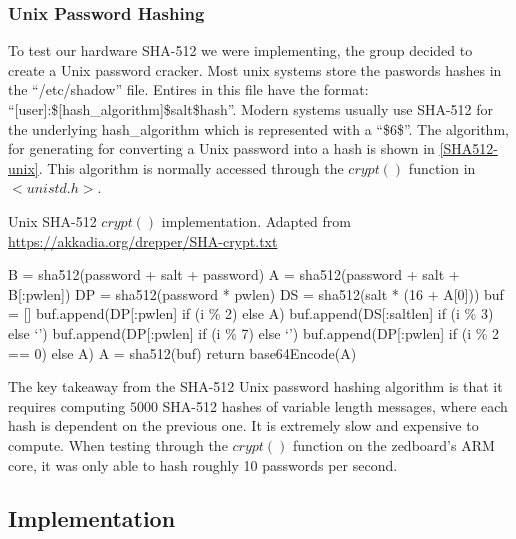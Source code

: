 \subsubsection{Unix Password Hashing}
To test our hardware SHA-512 we were implementing, the group decided to create a
Unix password cracker. Most unix systems store the paswords hashes in the
``/etc/shadow'' file. Entires in this file have the format: ``[user]:\$[hash\_algorithm]\$salt\$hash''.
Modern systems usually use SHA-512 for the underlying hash\_algorithm which is represented
with a ``\$6\$''. The algorithm, for generating for converting a Unix password
into a hash is shown in \ref{SHA512-unix}. This algorithm is normally
accessed through the $crypt()$ function in $<unistd.h>$.

\begin{algorithm}[!htb]
  \label{SHA512-unix}
  \caption{Unix SHA-512 $crypt()$ implementation. Adapted from \url{https://akkadia.org/drepper/SHA-crypt.txt}}
  \begin{algorithmic}
    \State B = sha512(password + salt + password)
    \State A = sha512(password + salt + B[:pwlen])
    \State DP = sha512(password * pwlen)
    \State DS = sha512(salt * (16 + A[0]))
      \State buf = []
      \State buf.append(DP[:pwlen] if (i \% 2) else A)
      \State buf.append(DS[:saltlen] if (i \% 3) else ‘’)
      \State buf.append(DP[:pwlen] if (i \% 7) else ‘’)
      \State buf.append(DP[:pwlen] if (i \% 2 == 0) else A)
      \State A = sha512(buf)
    \EndFor
    \State return base64Encode(A)
    \EndProcedure
  \end{algorithmic}
\end{algorithm}

The key takeaway from the SHA-512 Unix password hashing algorithm is
that it requires computing $5000$ SHA-512 hashes of variable length messages,
where each hash is dependent on the previous one. It is extremely slow
and expensive to compute. When testing through the $crypt()$ function
on the zedboard's ARM core, it was only able to hash roughly 10 passwords
per second.

\subsection{Implementation}
